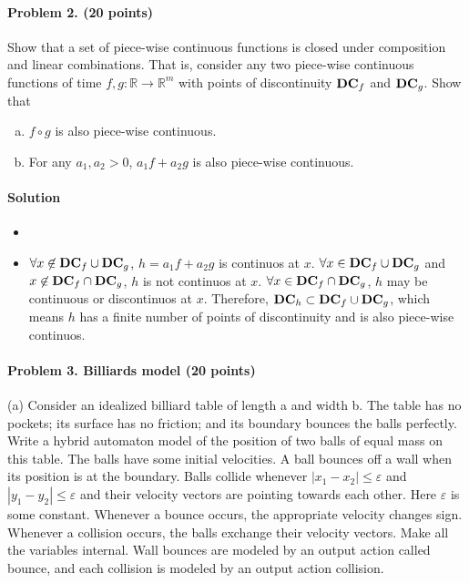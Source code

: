 \documentclass[11pt]{article}
\newcommand{\reals}[0]{\mathbb{R}}
\begin{document}
\paragraph{Problem 2. (20 points)}
Show that a set of piece-wise continuous functions is closed under composition and linear combinations. That is, consider any two piece-wise continuous functions of time $f, g: \reals \rightarrow \reals^m$ with points of discontinuity ${\bf DC}_f$ and ${\bf DC}_g$. Show that
\begin{enumerate}[(a)]
\item $f \circ g$ is also piece-wise continuous.
\item For any $a_1, a_2 >0$, $a_1  f + a_2 g$ is also piece-wise continuous.
\end{enumerate}

\paragraph{Solution}
\begin{itemize}[(a)]
\item
\item
$\forall x \not\in {\bf DC}_f \cup {\bf DC}_g$, $h = a_1  f + a_2 g$ is continuos at $x$. $\forall x \in {\bf DC}_f \cup {\bf DC}_g$ and $x \not\in {\bf DC}_f \cap {\bf DC}_g$, $h$ is not continuos at $x$. $\forall x \in {\bf DC}_f \cap {\bf DC}_g$, $h$ may be continuous or discontinuos at $x$. Therefore, ${\bf DC}_h \subset {\bf DC}_f \cup {\bf DC}_g$, which means $h$ has a finite number of points of discontinuity and is also piece-wise continuos.
\end{itemize}

\paragraph{Problem 3. Billiards model (20 points)}
(a) Consider an idealized billiard table of length a and width b. The table has no pockets; its surface has no friction; and its boundary bounces the balls perfectly. Write a hybrid automaton model of the position of two balls of equal mass on this table. The balls have some initial velocities. A ball bounces off a wall when its position is at the boundary. Balls collide whenever $|x_1-x_2|\leq\varepsilon$ and $|y_1-y_2| \leq \varepsilon$ and their velocity vectors are pointing towards each other. Here $\varepsilon$ is some constant. Whenever a bounce occurs, the appropriate velocity changes sign. Whenever a collision occurs, the balls exchange their velocity vectors. Make all the variables internal. Wall bounces are modeled by an output action called bounce, and each collision is modeled by an output action collision.
\end{document}
